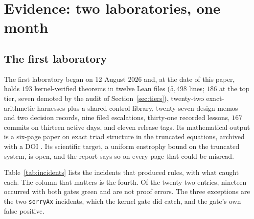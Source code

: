 \documentclass[11pt]{article}
\begin{document}
\section{Evidence: two laboratories, one month}
\label{sec:evidence}

\subsection{The first laboratory}

The first laboratory began on 12 August 2026 and, at the date of this paper, holds
$193$ kernel-verified theorems in twelve Lean files ($5{,}498$ lines; $186$ at the top tier,
seven demoted by the audit of Section~\ref{sec:tiers}), twenty-two exact-arithmetic harnesses
plus a shared control library, twenty-seven design memos and two decision records, nine filed
escalations, thirty-one
recorded lessons, $167$ commits on thirteen active days, and eleven release tags. Its mathematical
output is a six-page paper on exact triad structure in the truncated equations, archived with a
DOI \cite{socrateai2026triad}. Its scientific target, a uniform enstrophy bound on the truncated
system, is open, and the report says so on every page that could be misread.

Table~\ref{tab:incidents} lists the incidents that produced rules, with what caught each. The
column that matters is the fourth. Of the twenty-two entries, nineteen occurred with both gates
green and are not proof errors. The three exceptions are the two \texttt{sorryAx} incidents,
which the kernel gate did catch, and the gate's own false positive.
\end{document}
